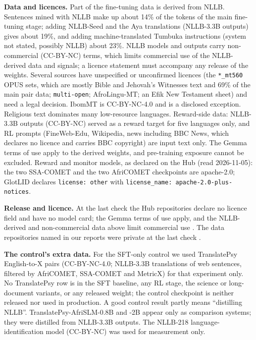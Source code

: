 \textbf{Data and licences.} Part of the fine-tuning data is derived from NLLB. Sentences mined with NLLB make up about 14\% of the tokens of the main fine-tuning stage; adding NLLB-Seed and the Aya translations (NLLB-3.3B outputs) gives about 19\%, and adding machine-translated Tumbuka instructions (system not stated, possibly NLLB) about 23\%. NLLB models and outputs carry non-commercial (CC-BY-NC) terms, which limits commercial use of the NLLB-derived data and signals; a licence statement must accompany any release of the weights. Several sources have unspecified or unconfirmed licences (the \texttt{*\_mt560} OPUS sets, which are mostly Bible and Jehovah's Witnesses text and 69\% of the main pair data; \texttt{multi-open}; AfroLingu-MT; an Efik New Testament sheet) and need a legal decision. IbomMT is CC-BY-NC-4.0 and is a disclosed exception. Religious text dominates many low-resource languages. Reward-side data: NLLB-3.3B outputs (CC-BY-NC) served as a reward target for five languages only, and RL prompts (FineWeb-Edu, Wikipedia, news including BBC News, which declares no licence and carries BBC copyright) are input text only. The Gemma terms of use apply to the derived weights, and pre-training exposure cannot be excluded. Reward and monitor models, as declared on the Hub (read 2026-11-05): the two SSA-COMET and the two AfriCOMET checkpoints are apache-2.0; GlotLID declares \texttt{license: other} with \texttt{license\_name: apache-2.0-plus-notices}.

\textbf{Release and licence.}  At the last check the Hub repositories declare no licence field and have no model card; the Gemma terms of use apply, and the NLLB-derived and non-commercial data above limit commercial use . The data repositories named in our reports were private at the last check .

\textbf{The control's extra data.} For the SFT-only control we used TranslatePsy English-to-X pairs (CC-BY-NC-4.0; NLLB-3.3B translations of web sentences, filtered by AfriCOMET, SSA-COMET and MetricX) for that experiment only. No TranslatePsy row is in the SFT baseline, any RL stage, the science or long-document variants, or any released weight; the control checkpoint is neither released nor used in production. A good control result partly means ``distilling NLLB''. TranslatePsy-AfriSLM-0.8B and -2B appear only as comparison systems; they were distilled from NLLB-3.3B outputs. The NLLB-218 language-identification model (CC-BY-NC) was used for measurement only.

